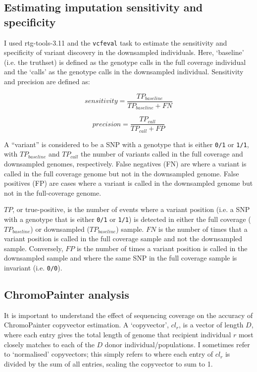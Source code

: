 \subsection{Estimating imputation sensitivity and specificity}

I used rtg-tools-3.11 \cite{cleary2014joint} and the \texttt{vcfeval} task to estimate the sensitivity and specificity of variant discovery in the downsampled individuals. Here, `baseline' (i.e. the truthset) is defined as the genotype calls in the full coverage individual and the `calls' as the genotype calls in the downsampled individual. Sensitivity and precision are defined as: 

\begin{equation}
sensitivity = \frac{TP_{baseline}}{TP_{baseline} + FN}
\end{equation}

\begin{equation}
precision = \frac{TP_{call}}{TP_{call} + FP}
\end{equation}

A ``variant'' is considered to be a SNP with a genotype that is either \texttt{0/1} or \texttt{1/1}, with $TP_{baseline}$ and $TP_{call}$ the number of variants called in the full coverage and downsampled genomes, respectively. False negatives (FN) are where a variant is called in the full coverage genome but not in the downsampled genome. False positives (FP) are cases where a variant is called in the downsampled genome but not in the full-coverage genome.

$TP$, or true-positive, is the number of events where a variant position (i.e. a SNP with a genotype that is either \texttt{0/1} or \texttt{1/1}) is detected in either the full coverage ($TP_{baseline}$) or downsampled ($TP_{baseline}$) sample. $FN$ is the number of times that a variant position is called in the full coverage sample and not the downsampled sample. Conversely, $FP$ is the number of times a variant position is called in the downsampled sample and where the same SNP in the full coverage sample is invariant (i.e. \texttt{0/0}).


\subsection{ChromoPainter analysis} \label{ChromoPainter_analysis}

It is important to understand the effect of sequencing coverage on the accuracy of ChromoPainter copyvector estimation. A `copyvector', $cl_{r}$, is a vector of length $D$, where each entry gives the total length of genome that recipient individual $r$ most closely matches to each of the $D$ donor individual/populations. I sometimes refer to `normalised' copyvectors; this simply refers to where each entry of $cl_r$ is divided by the sum of all entries, scaling the copyvector to sum to 1. 

